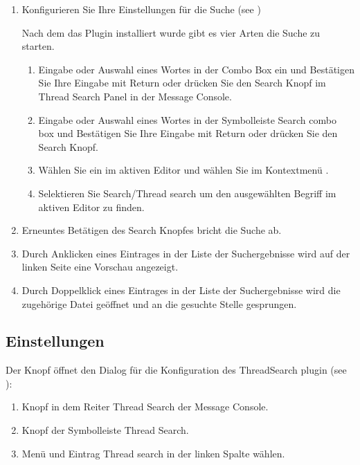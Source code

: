 \begin{enumerate}
\item Konfigurieren Sie Ihre Einstellungen für die Suche (see )

Nach dem das Plugin installiert wurde gibt es vier Arten die Suche zu starten.

\begin{enumerate}
\item Eingabe oder Auswahl eines Wortes in der Combo Box ein und Bestätigen Sie Ihre Eingabe mit Return oder drücken Sie den Search Knopf im Thread Search Panel in der Message Console.
\item Eingabe oder Auswahl eines Wortes in der Symbolleiste Search combo box und Bestätigen Sie Ihre Eingabe mit Return oder drücken Sie den Search Knopf.
\item Wählen Sie ein  im aktiven Editor und wählen Sie im Kontextmenü .
\item Selektieren Sie Search/Thread search um den ausgewählten Begriff im aktiven Editor zu finden.
\end{enumerate}
\item Erneuntes Betätigen des Search Knopfes bricht die Suche ab.
\item Durch Anklicken eines Eintrages in der Liste der Suchergebnisse wird auf der linken Seite eine Vorschau angezeigt.
\item Durch Doppelklick eines Eintrages in der Liste der Suchergebnisse wird die zugehörige Datei geöffnet und an die gesuchte Stelle gesprungen.
\end{enumerate}

\subsection{Einstellungen}

Der Knopf  öffnet den Dialog für die Konfiguration des ThreadSearch plugin (see ):


\begin{enumerate}
\item Knopf  in dem Reiter Thread Search der Message Console.
\item Knopf  der Symbolleiste Thread Search.
\item Menü  und Eintrag Thread search in der linken Spalte wählen.
\end{enumerate}


